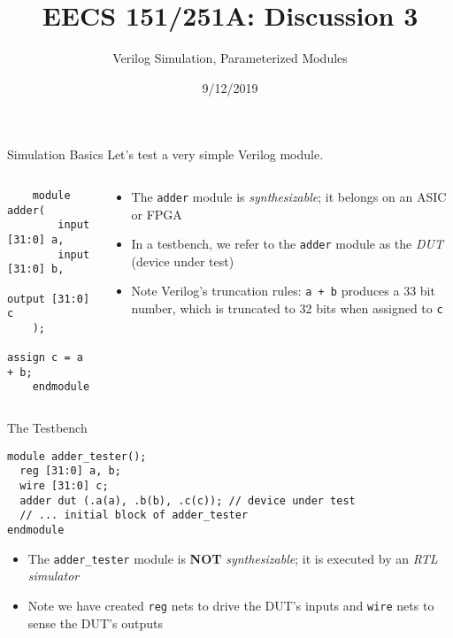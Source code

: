\documentclass[12pt,aspectratio=169]{beamer}
\title{EECS 151/251A: Discussion 3}
\subtitle{Verilog Simulation, Parameterized Modules}
\author{}
\date{9/12/2019}
\begin{document}
\begin{frame}
    \maketitle
\end{frame}

\begin{frame}[fragile]{Simulation Basics}
Let's test a very simple Verilog module.
  \begin{columns}
    \begin{column}{0.5\textwidth}
      \begin{center}
      \begin{verbatim}
    module adder(
        input [31:0] a,
        input [31:0] b,
        output [31:0] c
    );
        assign c = a + b;
    endmodule
      \end{verbatim}
      \end{center}
    \end{column}
    \begin{column}{0.5\textwidth}
      \begin{itemize}
        \item The \verb|adder| module is \textit{synthesizable}; it belongs on an ASIC or FPGA
        \item In a testbench, we refer to the \verb|adder| module as the \textit{DUT} (device under test)
        \item Note Verilog's truncation rules: \verb|a + b| produces a 33 bit number, which is truncated to 32 bits when assigned to \verb|c|
      \end{itemize}
    \end{column}
  \end{columns}
\end{frame}

\begin{frame}[fragile]{The Testbench}
  \begin{center}
    \begin{verbatim}
module adder_tester();
  reg [31:0] a, b;
  wire [31:0] c;
  adder dut (.a(a), .b(b), .c(c)); // device under test
  // ... initial block of adder_tester
endmodule
  \end{verbatim}
  \begin{itemize}
    \item The \verb|adder_tester| module is \textbf{NOT} \textit{synthesizable}; it is executed by an \textit{RTL simulator}
    \item Note we have created \verb|reg| nets to drive the DUT's inputs and \verb|wire| nets to sense the DUT's outputs
  \end{itemize}
  \end{center}
\end{frame}
\end{document}
